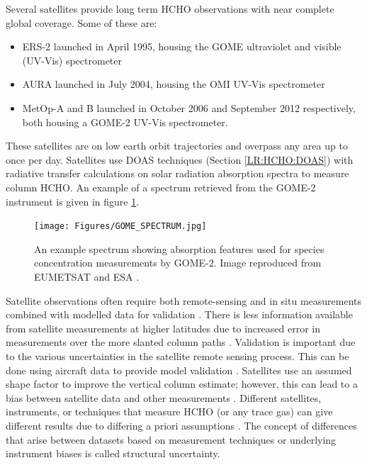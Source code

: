       Several satellites provide long term HCHO observations with near complete global coverage. 
      Some of these are:
      \begin{itemize}
        \item  ERS-2 launched in April 1995, housing the GOME ultraviolet and visible (UV-Vis) spectrometer
        \item AURA launched in July 2004, housing the OMI UV-Vis spectrometer
        \item MetOp-A and B launched in October 2006 and September 2012 respectively, both housing a GOME-2 UV-Vis spectrometer.
      \end{itemize}
      These satellites are on low earth orbit trajectories and overpass any area up to once per day.
      Satellites use DOAS techniques (Section \ref{LR:HCHO:DOAS}) with radiative transfer calculations on solar radiation absorption spectra to measure column HCHO.
      An example of a spectrum retrieved from the GOME-2 instrument is given in figure \ref{LR:HCHO:Sat:fig_GOME_products}.
      
      \begin{figure}
        \texttt{[image: Figures/GOME\_SPECTRUM.jpg]}
        \caption{%
          An example spectrum showing absorption features used for species concentration measurements by GOME-2. Image reproduced from EUMETSAT and ESA \parencite{GOME2Image}.
          }
        \label{LR:HCHO:Sat:fig_GOME_products}
      \end{figure}
      
      Satellite observations often require both remote-sensing and in situ measurements combined with modelled data for validation \parencite{Marais2014}.
      There is less information available from satellite measurements at higher latitudes due to increased error in measurements over the more slanted column paths \parencite{DeSmedt2015}.
      Validation is important due to the various uncertainties in the satellite remote sensing process.
      This can be done using aircraft data to provide model validation \parencite[e.g.,][]{Zhu2016}.
      Satellites use an assumed shape factor to improve the vertical column estimate; however, this can lead to a bias between satellite data and other measurements \parencite{Zhu2016}.
      Different satellites, instruments, or techniques that measure HCHO (or any trace gas) can give different results due to differing a priori assumptions \parencite{Lorente2017}.
      The concept of differences that arise between datasets based on measurement techniques or underlying instrument biases is called structural uncertainty.
      
